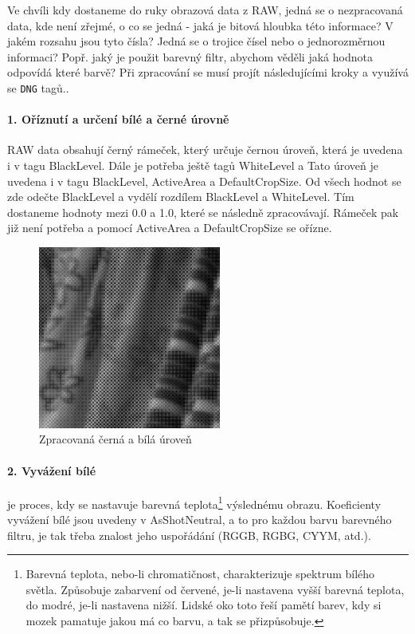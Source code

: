 \documentclass[12pt,a4paper,titlepage,final]{report}
\begin{document}
Ve chvíli kdy dostaneme do ruky obrazová data z RAW, jedná se o nezpracovaná data, kde není zřejmé, o co se jedná - jaká je bitová hloubka této informace? V jakém rozsahu jsou tyto čísla? Jedná se o trojice čísel nebo o jednorozměrnou informaci? Popř. jaký je použit barevný filtr, abychom věděli jaká hodnota odpovídá které barvě? Při zpracování se musí projít následujícími kroky a využívá se \verb|DNG| tagů..

\paragraph{1. Oříznutí a určení bílé a černé úrovně} RAW data obsahují černý rámeček, který určuje černou úroveň, která je uvedena i v tagu BlackLevel. Dále je potřeba ještě tagů WhiteLevel a  Tato úroveň je uvedena i v tagu BlackLevel, ActiveArea a DefaultCropSize. Od všech hodnot se zde odečte BlackLevel a vydělí rozdílem BlackLevel a WhiteLevel. Tím dostaneme hodnoty mezi 0.0 a 1.0, které se následně zpracovávají. Rámeček pak již není potřeba a pomocí ActiveArea a DefaultCropSize se ořízne.

\begin{figure}[ht]
\begin{center}
\includegraphics[width=6cm]{images/e_nonwb.png}
\caption{Zpracovaná černá a bílá úroveň}
\label{fig:non-wb}
\end{center}
\end{figure}

\paragraph{2. Vyvážení bílé} je proces, kdy se nastavuje barevná teplota\footnote{Barevná teplota, nebo-li chromatičnost, charakterizuje spektrum bílého světla. Způsobuje zabarvení od červené, je-li nastavena vyšší barevná teplota, do modré, je-li nastavena nižší. Lidské oko toto řeší pamětí barev, kdy si mozek pamatuje jakou má co barvu, a tak se přizpůsobuje.} výslednému obrazu. Koeficienty vyvážení bílé jsou uvedeny v AsShotNeutral, a to pro každou barvu barevného filtru, je tak třeba znalost jeho uspořádání (RGGB, RGBG, CYYM, atd.).
\end{document}
